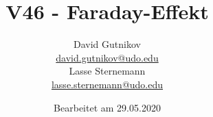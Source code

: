

\title{V46 - Faraday-Effekt}
\author{
  David Gutnikov\\
  \href{mailto:david.gutnikov@udo.edu}{david.gutnikov@udo.edu}\\
  Lasse Sternemann\\
  \href{mailto:lasse.sternemann@udo.edu}{lasse.sternemann@udo.edu}
}
\date{Bearbeitet am 29.05.2020}


    \maketitle
    \newpage
    \tableofcontents
    \newpage

    
    

    \newpage
    \printbibliography

